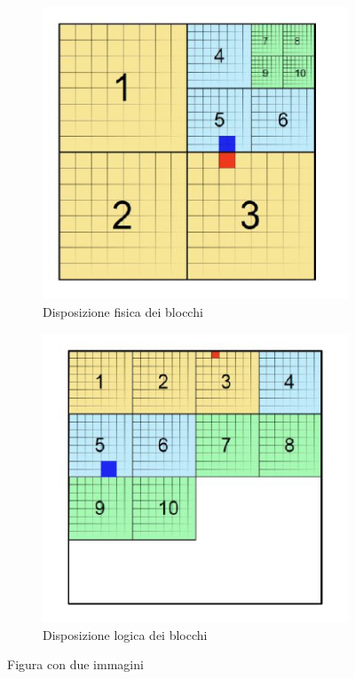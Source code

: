 \begin{figure}[ht]
	\centering
	\begin{subfigure}{0.3\textwidth}
		\includegraphics[width=1.0\textwidth]{immagini/disoposizione_blocchi_fisica.png}
		\caption{Disposizione fisica dei blocchi}
	\end{subfigure}%
	\begin{subfigure}{0.3\textwidth}
		\includegraphics[width=1.0\textwidth]{immagini/disoposizione_blocchi_logica.png}
		\caption{Disposizione logica dei blocchi}
	\end{subfigure}
	\caption{Figura con due immagini}
	\label{fig:two}
\end{figure}


